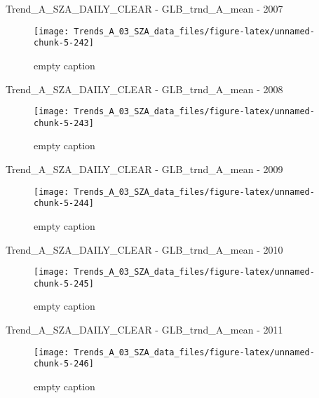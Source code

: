 \documentclass[
  10pt,
  a4paper,oneside]{article}
\begin{document}
Trend\_A\_SZA\_DAILY\_CLEAR - GLB\_trnd\_A\_mean - 2007

\begin{figure}[!ht]

{\centering \texttt{[image: Trends\_A\_03\_SZA\_data\_files/figure-latex/unnamed-chunk-5-242]} 

}

\caption{ empty caption }\label{fig:unnamed-chunk-5-242}
\end{figure}

Trend\_A\_SZA\_DAILY\_CLEAR - GLB\_trnd\_A\_mean - 2008

\begin{figure}[!ht]

{\centering \texttt{[image: Trends\_A\_03\_SZA\_data\_files/figure-latex/unnamed-chunk-5-243]} 

}

\caption{ empty caption }\label{fig:unnamed-chunk-5-243}
\end{figure}

Trend\_A\_SZA\_DAILY\_CLEAR - GLB\_trnd\_A\_mean - 2009

\begin{figure}[!ht]

{\centering \texttt{[image: Trends\_A\_03\_SZA\_data\_files/figure-latex/unnamed-chunk-5-244]} 

}

\caption{ empty caption }\label{fig:unnamed-chunk-5-244}
\end{figure}

Trend\_A\_SZA\_DAILY\_CLEAR - GLB\_trnd\_A\_mean - 2010

\begin{figure}[!ht]

{\centering \texttt{[image: Trends\_A\_03\_SZA\_data\_files/figure-latex/unnamed-chunk-5-245]} 

}

\caption{ empty caption }\label{fig:unnamed-chunk-5-245}
\end{figure}

Trend\_A\_SZA\_DAILY\_CLEAR - GLB\_trnd\_A\_mean - 2011

\begin{figure}[!ht]

{\centering \texttt{[image: Trends\_A\_03\_SZA\_data\_files/figure-latex/unnamed-chunk-5-246]} 

}

\caption{ empty caption }\label{fig:unnamed-chunk-5-246}
\end{figure}
\end{document}
